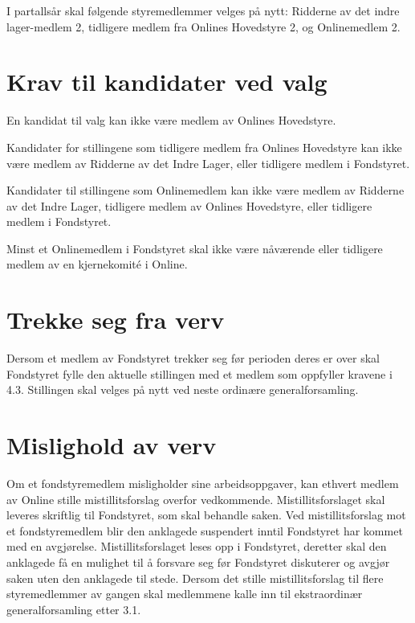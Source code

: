 I partallsår skal følgende styremedlemmer velges på nytt: Ridderne av det indre lager-medlem 2, tidligere medlem fra Onlines Hovedstyre 2, og Onlinemedlem 2.

\section{Krav til kandidater ved valg}
En kandidat til valg kan ikke være medlem av Onlines Hovedstyre.

Kandidater for stillingene som tidligere medlem fra Onlines Hovedstyre kan ikke være medlem av Ridderne av det Indre Lager, eller tidligere medlem i Fondstyret.

Kandidater til stillingene som Onlinemedlem kan ikke være medlem av Ridderne av det Indre Lager, tidligere medlem av Onlines Hovedstyre, eller tidligere medlem i Fondstyret.

Minst et Onlinemedlem i Fondstyret skal ikke være nåværende eller tidligere medlem av en kjernekomité i Online.

\section{Trekke seg fra verv}

Dersom et medlem av Fondstyret trekker seg før perioden deres er over skal Fondstyret fylle den aktuelle stillingen med et medlem som oppfyller kravene i 4.3. Stillingen skal velges på nytt ved neste ordinære generalforsamling.

\section{Mislighold av verv}
Om et fondstyremedlem misligholder sine arbeidsoppgaver, kan ethvert medlem av Online stille mistillitsforslag overfor vedkommende. Mistillitsforslaget skal leveres skriftlig til Fondstyret, som skal behandle saken. Ved mistillitsforslag mot et fondstyremedlem blir den anklagede suspendert inntil Fondstyret har kommet med en avgjørelse. Mistillitsforslaget leses opp i Fondstyret, deretter skal den anklagede få en mulighet til å forsvare seg før Fondstyret diskuterer og avgjør saken uten den anklagede til stede. Dersom det stille mistillitsforslag til flere styremedlemmer av gangen skal medlemmene kalle inn til ekstraordinær generalforsamling etter 3.1.
